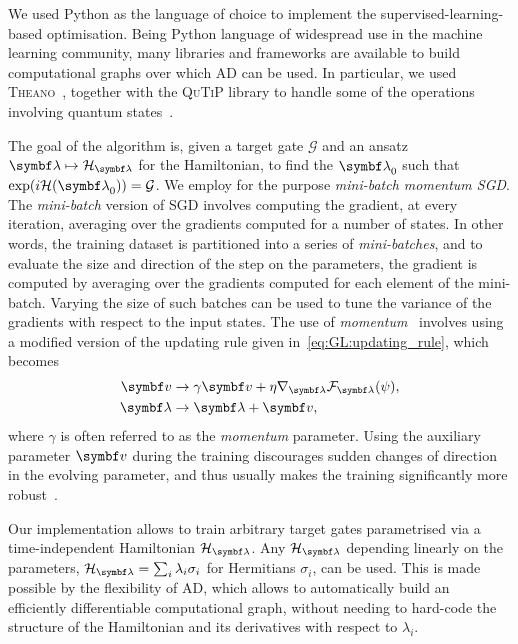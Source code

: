 We used Python as the language of choice to implement the supervised-learning-based optimisation.
Being Python language of widespread use in the machine learning community, many libraries and frameworks are available to build computational graphs over which \ac{AD} can be used.
In particular, we used \textsc{Theano}~\cite{team2016theano}, together with the \textsc{QuTiP} library to handle some of the operations involving quantum states~\cite{johansson2012qutip,johansson2013qutip}.

The goal of the algorithm is, given a target gate $\mathcal G$ and an ansatz $\bslambda\mapsto\calH_\bslambda$ for the Hamiltonian, to find the $\bslambda_0$ such that $\exp(i\calH(\bslambda_0))=\calG$.
We employ for the purpose \emph{mini-batch momentum \ac{SGD}}.
The \emph{mini-batch} version of \ac{SGD} involves computing the gradient, at every iteration, averaging over the gradients computed for a number of states.
In other words, the training dataset is partitioned into a series of \emph{mini-batches}, and to evaluate the size and direction of the step on the parameters, the gradient is computed by averaging over the gradients computed for each element of the mini-batch.
Varying the size of such batches can be used to tune the variance of the gradients with respect to the input states.
The use of \emph{momentum}~\cite{ruder2016overview,goh2017momentum} involves using a modified version of the updating rule given in~\cref{eq:GL:updating_rule}, which becomes
\begin{equation}
\begin{aligned}
    \bs v &\to \gamma \bs v + \eta \grad_{\bslambda} \calF_\bslambda(\psi), \\
    \bslambda &\to \bslambda + \bs v,
\end{aligned}
\label{eq:GL:updating_rule_momentum}
\end{equation}
where $\gamma$ is often referred to as the \emph{momentum} parameter.
Using the auxiliary parameter $\bs v$ during the training discourages sudden changes of direction in the evolving parameter, and thus usually makes the training significantly more robust~\cite{goh2017momentum}.

Our implementation allows to train arbitrary target gates parametrised via a time-independent Hamiltonian $\calH_\bslambda$.
Any $\calH_\bslambda$ depending linearly on the parameters, $\calH_\bslambda=\sum_i \lambda_i \sigma_i$ for Hermitians $\sigma_i$, can be used.
This is made possible by the flexibility of \ac{AD}, which allows to automatically build an efficiently differentiable computational graph, without needing to hard-code the structure of the Hamiltonian and its derivatives with respect to $\lambda_i$.

